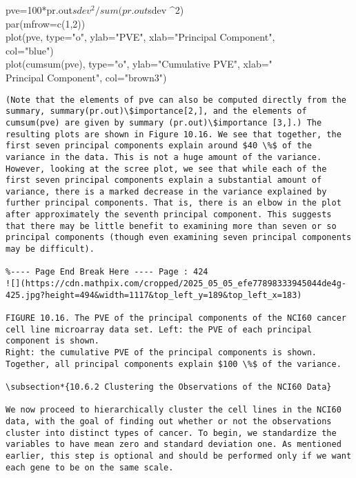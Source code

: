 \documentclass[10pt]{article}
\begin{document}
\begin{displayquote}
pve=100*pr.out$sdev^2/sum(pr.out$sdev \^{}2)\\
par(mfrow=c(1,2))\\
plot(pve, type="o", ylab="PVE", xlab="Principal Component",\\
col="blue")\\
plot(cumsum(pve), type="o", ylab="Cumulative PVE", xlab="\\
Principal Component", col="brown3")
\end{displayquote}

\begin{verbatim}
(Note that the elements of pve can also be computed directly from the summary, summary(pr.out)\$importance[2,], and the elements of cumsum(pve) are given by summary (pr.out)\$importance [3,].) The resulting plots are shown in Figure 10.16. We see that together, the first seven principal components explain around $40 \%$ of the variance in the data. This is not a huge amount of the variance. However, looking at the scree plot, we see that while each of the first seven principal components explain a substantial amount of variance, there is a marked decrease in the variance explained by further principal components. That is, there is an elbow in the plot after approximately the seventh principal component. This suggests that there may be little benefit to examining more than seven or so principal components (though even examining seven principal components may be difficult).

%---- Page End Break Here ---- Page : 424
![](https://cdn.mathpix.com/cropped/2025_05_05_efe77898333945044de4g-425.jpg?height=494&width=1117&top_left_y=189&top_left_x=183)

FIGURE 10.16. The PVE of the principal components of the NCI60 cancer cell line microarray data set. Left: the PVE of each principal component is shown.
Right: the cumulative PVE of the principal components is shown. Together, all principal components explain $100 \%$ of the variance.

\subsection*{10.6.2 Clustering the Observations of the NCI60 Data}

We now proceed to hierarchically cluster the cell lines in the NCI60 data, with the goal of finding out whether or not the observations cluster into distinct types of cancer. To begin, we standardize the variables to have mean zero and standard deviation one. As mentioned earlier, this step is optional and should be performed only if we want each gene to be on the same scale.
\end{verbatim}
\end{document}
